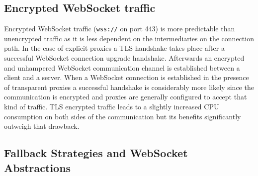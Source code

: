 \newpage
\subsection{Encrypted WebSocket traffic}

Encrypted WebSocket traffic (\texttt{wss://} on port 443) is more predictable than unencrypted traffic as it is less dependent on the intermediaries on the connection path. In the case of explicit proxies a TLS handshake takes place after a successful WebSocket connection upgrade handshake. Afterwards an encrypted and unhampered WebSocket communication channel is established between a client and a server. When a WebSocket connection is established in the presence of transparent proxies a successful handshake is considerably more likely since the communication is encrypted and proxies are generally configured to accept that kind of traffic. TLS encrypted traffic leads to a slightly increased CPU consumption on both sides of the communication but its benefits significantly outweigh that drawback.

\subsection{Fallback Strategies and WebSocket Abstractions}

